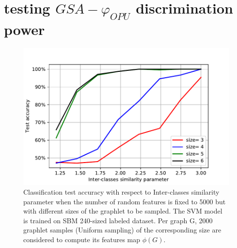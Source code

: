 \section{testing $GSA-\varphi_{OPU}$ discrimination power}
\begin{figure}[H]
\centering
\includegraphics[scale=0.7]{Dissertation/figs/LightOn_adj_SBM_Similarity_graphlet_size.pdf}

\caption[Classification test accuracy as a function of Inter-classes similarity parameter ]{Classification test accuracy with respect to Inter-classes similarity parameter when the number of random features is fixed to 5000 but with different sizes of the graphlet to be sampled. The SVM model is trained on SBM 240-sized labeled dataset. Per graph G, 2000 graphlet samples (Uniform sampling) of the corresponding size are considered to compute its features map $\phi(G)$.}
\label{fig:LightOn_adj_SBM_mult_factor}
\end{figure}

